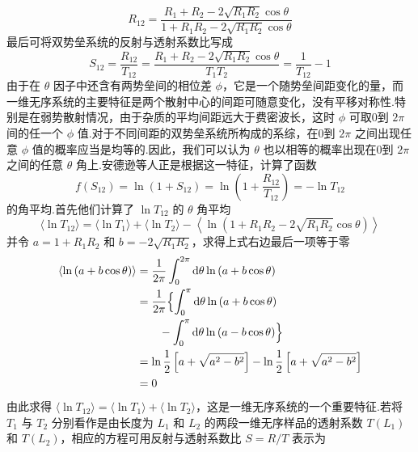\begin{equation}
  R_{12}=\frac{R_{1}+R_{2}-2\sqrt{R_{1}R_{2}}\cos\theta}
  {1+R_{1}R_{2}-2\sqrt{R_{1}R_{2}}\cos\theta}
\end{equation}
最后可将双势垒系统的反射与透射系数比写成
\begin{equation}
  S_{12}=\frac{R_{12}}{T_{12}}
  =\frac{R_{1}+R_{2}-2\sqrt{R_{1}R_{2}}\cos\theta}{T_{1}T_{2}}
  =\frac{1}{T_{12}}-1
\end{equation}
由于在 $\theta$ 因子中还含有两势垒间的相位差 $\phi$，它是一个随势垒间距变化的量，而一维无序系统的主要特征是两个散射中心的间距可随意变化，没有平移对称性.特别是在弱势散射情况，由于杂质的平均间距远大于费密波长，这时 $\phi$ 可取0到 $2\pi$ 间的任一个 $\phi$ 值.对于不同间距的双势垒系统所构成的系综，在0到 $2\pi$ 之间出现任意 $\phi$ 值的概率应当是均等的.因此，我们可以认为 $\theta$ 也以相等的概率出现在0到 $2\pi$ 之间的任意 $\theta$ 角上.安德逊等人正是根据这一特征，计算了函数
\begin{equation}
  f\left(S_{12}\right)=\ln\left(1+S_{12}\right)
  =\ln\left(1+\frac{R_{12}}{T_{12}}\right)=-\ln T_{12}
\end{equation}
的角平均.首先他们计算了 $\ln T_{12}$ 的 $\theta$ 角平均
\begin{equation*}
  \langle\ln T_{12}\rangle=\langle\ln T_{1}\rangle+\langle\ln T_{2}\rangle
  -\left\langle\ln\left(1+R_{1}R_{2}-2\sqrt{R_{1}R_{2}}\cos\theta\right)\right\rangle
\end{equation*}
并令 $a=1+R_{1}R_{2}$ 和 $b=-2\sqrt{R_{1}R_{2}}$，求得上式右边最后一项等于零
\begin{equation}
\begin{aligned}
  \left\langle\ln\left(a+b\cos\theta\right)\right\rangle
  &=\frac{1}{2\pi}\int_{0}^{2\pi}\mathrm{d}\theta\ln\left(a+b\cos\theta\right)\\
  &=\frac{1}{2\pi}\Bigl\{\int_{0}^{\pi}\mathrm{d}\theta\ln\left(a+b\cos\theta\right)\\
  &\qquad-\int_{0}^{\pi}\mathrm{d}\theta\ln\left(a-b\cos\theta\right)\Bigr\}\\
  &=\ln\frac{1}{2}\left[a+\sqrt{a^{2}-b^{2}}\right]
  -\ln\frac{1}{2}\left[a+\sqrt{a^{2}-b^{2}}\right]\\
  &=0
\end{aligned}
\end{equation}
由此求得 $\langle\ln T_{12}\rangle=\langle\ln T_{1}\rangle+\langle\ln T_{2}\rangle$，这是一维无序系统的一个重要特征.若将 $T_{1}$ 与 $T_{2}$ 分别看作是由长度为 $L_{1}$ 和 $L_{2}$ 的两段一维无序样品的透射系数 $T\left(L_{1}\right)$ 和 $T\left(L_{2}\right)$，相应的方程可用反射与透射系数比 $S=R/T$ 表示为
